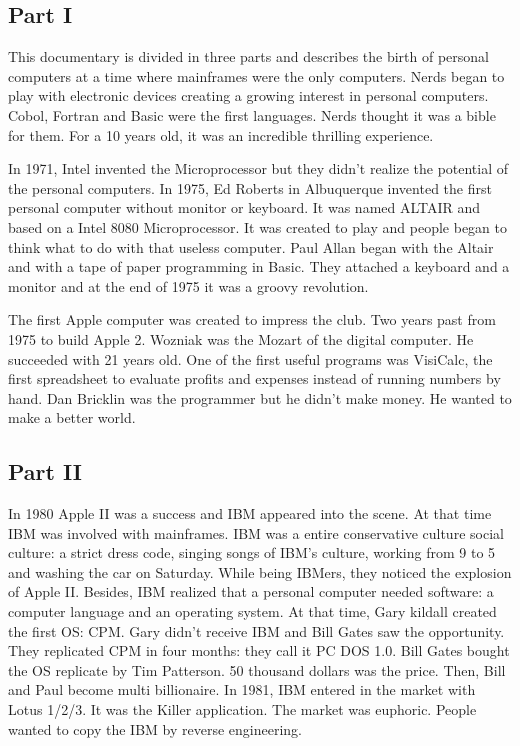  
 \subsection*{Part I}
 This documentary is divided in three parts and describes the birth of personal computers at a time where 
 mainframes were the only computers. Nerds began to play with electronic devices  
 creating a growing interest in personal computers. Cobol, Fortran and Basic were the 
 first languages. Nerds thought it was a bible for them. 
 For a 10 years old, it was an incredible thrilling experience.
  
 In 1971, Intel invented the Microprocessor but they didn't realize the potential of the personal computers.    
 In 1975, Ed Roberts in Albuquerque invented the first personal computer without monitor or keyboard.
 It was named ALTAIR and based on a Intel 8080 Microprocessor.
 It was created to play and people began to think what to do with that useless computer.   
 Paul Allan began with the Altair and with a tape of paper programming in Basic. 
 They attached a keyboard and a monitor and at the end of 1975 it was a  groovy revolution. 
   
 The first Apple computer was created to impress the club. 
 Two years past from 1975 to build Apple 2. Wozniak was the Mozart of the digital computer. 
 He succeeded with 21 years old. 
 One of the first useful programs was VisiCalc, the first spreadsheet to evaluate 
 profits and expenses instead of running numbers by hand. 
 Dan Bricklin was the programmer but he didn't make money. 
 He wanted to make a better world. 
   
  
   
 \subsection*{Part II}
 In 1980 Apple II was a success and  IBM appeared into the scene. 
 At that time IBM was involved with mainframes. 
 IBM was  a entire  conservative culture social culture:  a strict dress code, 
 singing songs of IBM's culture,
 working from 9 to 5 and  washing the car on Saturday. 
 While being IBMers, they noticed the explosion of Apple II. 
 Besides, IBM realized that  a personal computer  needed software: a computer language and an  
 operating system.  At that time, Gary kildall created the first OS: CPM.
 Gary didn't receive IBM and Bill Gates saw the opportunity. 
 They replicated CPM in four months: they call it PC DOS 1.0. 
 Bill Gates  bought the OS replicate by Tim Patterson. 50 thousand dollars was the price. 
 Then, Bill and Paul become multi  billionaire.  
 In 1981, IBM entered in the market with Lotus 1/2/3.
 It was the Killer application. The market was euphoric. 
 People wanted to copy the IBM by  reverse engineering. 
   
